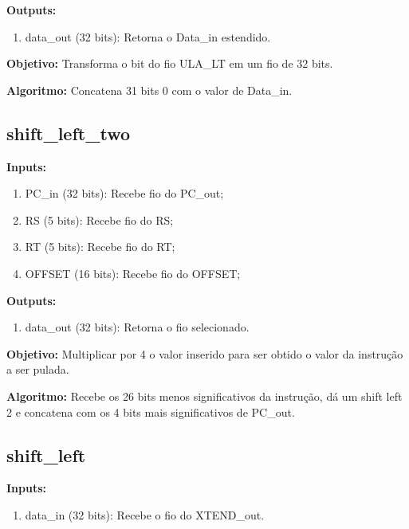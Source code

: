 \textbf{Outputs:}

\begin{enumerate}
    \item data\_out (32 bits): Retorna o Data\_in estendido.
\end{enumerate}

\textbf{Objetivo:} Transforma o bit do fio ULA\_LT em um fio de 32 bits.

\textbf{Algoritmo:} Concatena 31 bits 0 com o valor de Data\_in.

\newpage

\subsection{shift\_left\_two}

\textbf{Inputs:}

\begin{enumerate}
    \item PC\_in (32 bits): Recebe fio do PC\_out;
    \item RS (5 bits): Recebe fio do RS;
    \item RT (5 bits): Recebe fio do RT;
    \item OFFSET (16 bits): Recebe fio do OFFSET;

\end{enumerate}

\textbf{Outputs:}

\begin{enumerate}
    \item data\_out (32 bits): Retorna o fio selecionado.
\end{enumerate}

\textbf{Objetivo:} Multiplicar por 4 o valor inserido para ser obtido o valor da instrução a ser pulada.

\textbf{Algoritmo:} Recebe os 26 bits menos significativos da instrução, dá um shift left 2 e concatena com os 4 bits mais significativos de PC\_out.


\subsection{shift\_left}

\textbf{Inputs:}

\begin{enumerate}
    \item data\_in (32 bits): Recebe o fio do XTEND\_out.

\end{enumerate}

